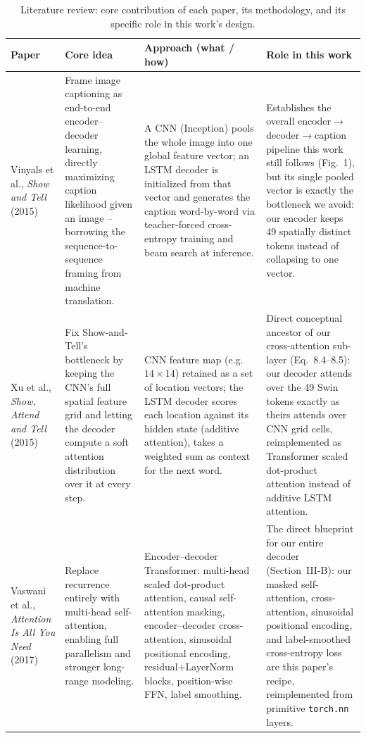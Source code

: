 \documentclass[conference]{IEEEtran}
\begin{document}
\begin{table}[t]
\centering
\caption{Literature review: core contribution of each paper, its methodology, and its specific role in this work's design.}
\label{tab:litreview}
\small
\begin{tabularx}{\textwidth}{@{}p{2.3cm}X X X@{}}
\toprule
\textbf{Paper} & \textbf{Core idea} & \textbf{Approach (what / how)} & \textbf{Role in this work} \\
\midrule

Vinyals et al., \emph{Show and Tell}~\cite{vinyals2015show} (2015)
&
Frame image captioning as end-to-end encoder--decoder learning, directly maximizing caption likelihood given an image -- borrowing the sequence-to-sequence framing from machine translation.
&
A CNN (Inception) pools the whole image into one global feature vector; an LSTM decoder is initialized from that vector and generates the caption word-by-word via teacher-forced cross-entropy training and beam search at inference.
&
Establishes the overall encoder$\to$decoder$\to$caption pipeline this work still follows (Fig.~1), but its single pooled vector is exactly the bottleneck we avoid: our encoder keeps 49 spatially distinct tokens instead of collapsing to one vector. \\

Xu et al., \emph{Show, Attend and Tell}~\cite{xu2015show} (2015)
&
Fix Show-and-Tell's bottleneck by keeping the CNN's full spatial feature grid and letting the decoder compute a soft attention distribution over it at every step.
&
CNN feature map (e.g.\ $14\times14$) retained as a set of location vectors; the LSTM decoder scores each location against its hidden state (additive attention), takes a weighted sum as context for the next word.
&
Direct conceptual ancestor of our cross-attention sub-layer (Eq.~8.4--8.5): our decoder attends over the 49 Swin tokens exactly as theirs attends over CNN grid cells, reimplemented as Transformer scaled dot-product attention instead of additive LSTM attention. \\

Vaswani et al., \emph{Attention Is All You Need}~\cite{vaswani2017attention} (2017)
&
Replace recurrence entirely with multi-head self-attention, enabling full parallelism and stronger long-range modeling.
&
Encoder--decoder Transformer: multi-head scaled dot-product attention, causal self-attention masking, encoder--decoder cross-attention, sinusoidal positional encoding, residual+LayerNorm blocks, position-wise FFN, label smoothing.
&
The direct blueprint for our entire decoder (Section~III-B): our masked self-attention, cross-attention, sinusoidal positional encoding, and label-smoothed cross-entropy loss are this paper's recipe, reimplemented from primitive \texttt{torch.nn} layers. \\


\end{tabularx}
\end{table}
\end{document}
